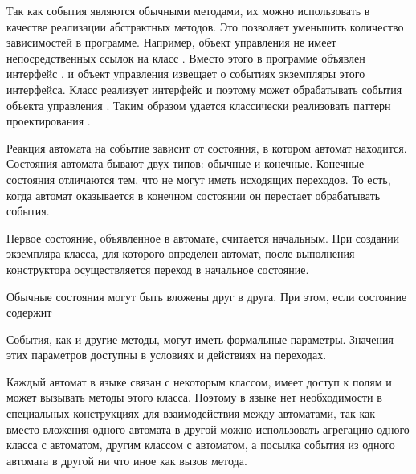 Так как события являются обычными методами, их можно использовать в качестве реализации абстрактных методов. Это позволяет уменьшить количество зависимостей в программе. Например, объект управления  не имеет непосредственных ссылок на класс . Вместо этого в программе объявлен интерфейс , и объект управления  извещает о событиях экземпляры этого интерфейса. Класс  реализует интерфейс  и поэтому может обрабатывать события объекта управления . Таким образом удается классически реализовать паттерн проектирования  \cite{gof}.

Реакция автомата на событие зависит от состояния, в котором автомат находится. Состояния автомата бывают двух типов: обычные и конечные. Конечные состояния отличаются тем, что не могут иметь исходящих переходов. То есть, когда автомат оказывается в конечном состоянии он перестает обрабатывать события.

Первое состояние, объявленное в автомате, считается начальным. При создании экземпляра класса, для которого определен автомат, после выполнения конструктора осуществляется переход в начальное состояние.

Обычные состояния могут быть вложены друг в друга. При этом, если состояние содержит

События, как и другие методы, могут иметь формальные параметры. Значения этих параметров доступны в условиях и действиях на переходах.



Каждый автомат в языке  связан с некоторым классом, имеет доступ к полям и может вызывать методы этого класса. Поэтому в языке  нет необходимости в специальных конструкциях для взаимодействия между автоматами, так как вместо вложения одного автомата в другой можно использовать агрегацию одного класса с автоматом, другим классом с автоматом, а посылка события из одного автомата в другой ни что иное как вызов метода.
